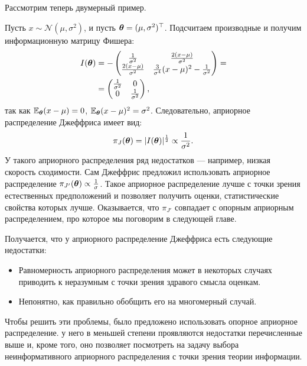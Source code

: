 Рассмотрим теперь двумерный пример.
\begin{example}
Пусть $x \sim \mathcal{N}(\mu, \sigma^2)$, и пусть $\boldsymbol{\theta} = (\mu, \sigma^2)^\top$.
Подсчитаем производные и получим информационную матрицу Фишера:
\begin{align*}
I(\boldsymbol{\theta}) &= -
\begin{pmatrix}
\frac{1}{\sigma^2}           & \frac{2 (x - \mu)}{\sigma^2} \\
\frac{2 (x - \mu)}{\sigma^2} & \frac{3}{\sigma^4} (x - \mu)^2 - \frac{1}{\sigma^2} \\
\end{pmatrix} = \\
&= 
\begin{pmatrix}
\frac{1}{\sigma^2} & 0 \\
0 & \frac{1}{\sigma^2} \\
\end{pmatrix},
\end{align*}
так как $\mathbb{E}_{\boldsymbol{\theta}} (x - \mu) = 0$, $\mathbb{E}_{\boldsymbol{\theta}} (x - \mu)^2 = \sigma^2$.
Следовательно, априорное распределение Джеффриса имеет вид:
\[
\pi_J(\boldsymbol{\theta}) = |I(\boldsymbol{\theta})|^{\frac12} \propto \frac{1}{\sigma^2}.
\]
У такого априорного распределения ряд недостатков --- например, низкая скорость сходимости.
Сам Джеффрис предложил использовать априорное распределение $\pi_{J'}(\boldsymbol{\theta}) \propto \frac{1}{\sigma}$.
Такое априорное распределение лучше с точки зрения естественных предположений и позволяет получить оценки, статистические свойства которых лучше.
Оказывается, что $\pi_{J'}$ совпадает с опорным априорным распределением, про которое мы поговорим в следующей главе.
\end{example}

Получается, что у априорного распределение Джеффриса есть следующие недостатки:
\begin{itemize}
	\item Равномерность априорного распределения может в некоторых случаях приводить к неразумным с точки зрения здравого смысла оценкам.
	\item Непонятно, как правильно обобщить его на многомерный случай.
\end{itemize}

Чтобы решить эти проблемы, было предложено использовать опорное априорное распределение.
у него в меньшей степени проявляются недостатки перечисленные выше и, кроме того, оно позволяет посмотреть на задачу выбора неинформативного априорного распределения с точки зрения теории информации.